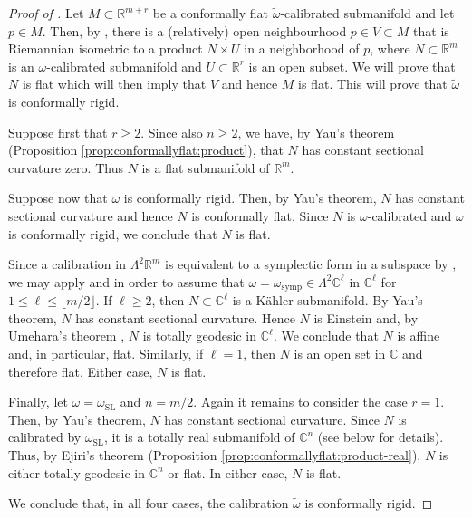 \documentclass[a4paper,leqno,11pt]{amsart}
\numberwithin{equation}{section}
\theoremstyle{remark}
\theoremstyle{remark}
\newcommand{\R}{\mathbb{R}}
\newcommand{\C}{\mathbb{C}}
\newcommand{\symp}{\mathrm{symp}}
\newcommand{\SL}{\mathrm{SL}}
\begin{document}
\begin{proof}[Proof of ]
Let $M\subset \R^{m+r}$ be a conformally flat $\widetilde \omega$-calibrated submanifold and let $p\in M$. Then, by , there is a (relatively) open neighbourhood $p \in V \subset M$ that is Riemannian isometric to a product $N \times U$ in a neighborhood of $p$, where $N \subset \R^m$ is an $\omega$-calibrated submanifold and $U \subset \R^r$ is an open subset. We will prove that $N$ is flat which will then imply that $V$ and hence $M$ is flat. This will prove that $\widetilde{\omega}$ is conformally rigid.

Suppose first that $r\ge 2$. Since also $n\ge 2$, we have, by Yau's theorem (Proposition \ref{prop:conformallyflat:product}), that $N$ has constant sectional curvature zero. Thus $N$ is a flat submanifold of $\R^m$.

Suppose now that $\omega$ is conformally rigid. Then, by Yau's theorem, $N$ has constant sectional curvature and hence $N$ is conformally flat. Since $N$ is $\omega$-calibrated and $\omega$ is conformally rigid, we conclude that $N$ is flat.

Since a calibration in $\Lambda^2 \mathbb{R}^m$ is equivalent to a symplectic form in a subspace by , we may apply  and  in order to assume that $\omega = \omega_{\symp} \in \Lambda^2 \C^\ell$ in $\C^\ell$ for $1 \leq \ell \leq \lfloor m/2 \rfloor$. If $\ell \geq 2$, then $N \subset \C^{\ell}$ is a K\"ahler submanifold. By Yau's theorem, $N$ has constant sectional curvature. Hence $N$ is Einstein and, by Umehara's theorem \cite{Ume:87}, $N$ is totally geodesic in $\C^\ell$. We conclude that $N$ is affine and, in particular, flat. Similarly, if $\ell = 1$, then $N$ is an open set in $\C$ and therefore flat. Either case, $N$ is flat.

Finally, let $\omega = \omega_\SL$ and $n=m/2$. Again it remains to consider the case $r=1$. Then, by Yau's theorem, $N$ has constant sectional curvature. Since $N$ is calibrated by $\omega_\SL$, it is a totally real submanifold of $\C^n$ (see  below for details). Thus, by Ejiri's theorem (Proposition \ref{prop:conformallyflat:product-real}), $N$ is either totally geodesic in $\C^n$ or flat. In either case, $N$ is flat.

We conclude that, in all four cases, the calibration $\widetilde \omega$ is conformally rigid.
\end{proof}
\end{document}
